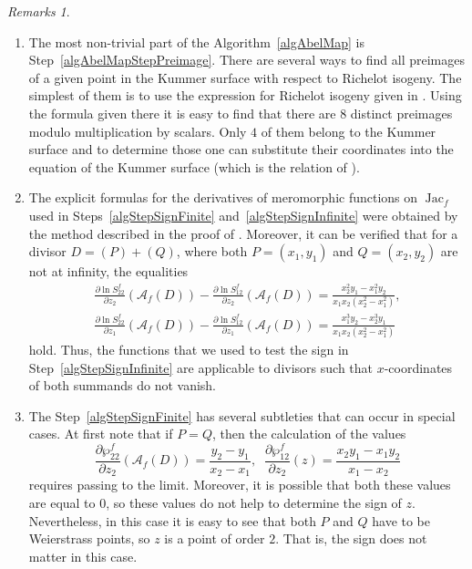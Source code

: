 \documentclass{amsart}
\numberwithin{equation}{section}
\theoremstyle{definition}
\theoremstyle{remark}
\newtheorem*{remarks}{Remarks}
\DeclareMathOperator{\Jac}{Jac}
\begin{document}
	\begin{remarks}\hfill
		\begin{enumerate}
			\item The most non-trivial part of the Algorithm~\ref{algAbelMap} is Step~\ref{algAbelMapStepPreimage}. There are several ways to find all preimages of a given point in the Kummer surface with respect to Richelot isogeny. The simplest of them is to use the expression for Richelot isogeny given in \cite[Theorem~4.4]{RichelotExpression}. Using the formula given there it is easy to find that there are $8$ distinct preimages modulo multiplication by scalars. Only $4$ of them belong to the Kummer surface and to determine those one can substitute their coordinates into the equation of the Kummer surface (which is the relation of \cite[Proposition~2.2]{KleinianWeight2}).
			\item The explicit formulas for the derivatives of meromorphic functions on $\Jac_f$ used in Steps~\ref{algStepSignFinite} and~\ref{algStepSignInfinite} were obtained by the method described in the proof of \cite[Proposition~4.6]{KleinianWeight2}. Moreover, it can be verified that for a divisor $D = (P) + (Q)$, where both $P = (x_1,y_1)$ and $Q = (x_2,y_2)$ are not at infinity, the equalities
			\[
			\begin{gathered}
				\frac{\partial \ln S_{22}^f}{\partial z_2}(\mathscr A_f(D)) - \frac{\partial \ln S_{12}^f}{\partial z_2}(\mathscr A_f(D)) = \frac{x_2^2 y_1 - x_1^2 y_2}{x_1x_2(x_2^2 - x_1^2)},\\ \frac{\partial \ln S_{22}^f}{\partial z_1}(\mathscr A_f(D)) - \frac{\partial \ln S_{12}^f}{\partial z_1}(\mathscr A_f(D)) = \frac{x_1^3 y_2 - x_2^3 y_1}{x_1x_2(x_2^2 - x_1^2)}
			\end{gathered}
			\]
			hold. Thus, the functions that we used to test the sign in Step~\ref{algStepSignInfinite} are applicable to divisors such that $x$-coordinates of both summands do not vanish. 
			\item The Step~\ref{algStepSignFinite} has several subtleties that can occur in special cases. At first note that if $P = Q$, then the calculation of the values 
			\[
			\frac{\partial \wp_{22}^f}{\partial z_2}(\mathscr A_f(D)) = \frac{y_2 - y_1}{x_2 - x_1},\;\;\frac{\partial \wp_{12}^f}{\partial z_2}(z) = \frac{x_2 y_1 - x_1 y_2}{x_1 - x_2}
			\] 
			requires passing to the limit. Moreover, it is possible that both these values are equal to $0$, so these values do not help to determine the sign of $z$. Nevertheless, in this case it is easy to see that both $P$ and $Q$ have to be Weierstrass points, so $z$ is a point of order $2$. That is, the sign does not matter in this case.

\end{enumerate}
\end{remarks}
\end{document}
